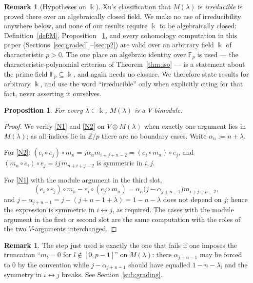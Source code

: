 \documentclass[11pt,reqno]{amsart}
\theoremstyle{plain}
\newtheorem{proposition}[theorem]{Proposition}
\theoremstyle{definition}
\newtheorem{remark}[theorem]{Remark}
\newcommand{\kk}{\Bbbk}
\newcommand{\Fp}{\mathbb{F}_p}
\newcommand{\Zp}{\mathbb{Z}/p}
\begin{document}
\begin{remark}[Hypotheses on $\kk$]\label{rem:hypotheses}
Xu's classification \cite{Xu1996} that $M(\lambda)$ is \emph{irreducible} is proved there over
an algebraically closed field. We make no use of irreducibility anywhere below, and none of
our results require $\kk$ to be algebraically closed: Definition~\ref{def:M}, Proposition~
\ref{prop:module}, and every cohomology computation in this paper (Sections~\ref{sec:graded}
--\ref{sec:p2}) are valid over an arbitrary field $\kk$ of characteristic $p>0$. The one place
an algebraic identity over $\Fp$ is used --- the characteristic-polynomial criterion of
Theorem~\ref{thm:iso} --- is a statement about the prime field $\Fp\subseteq\kk$, and again
needs no closure. We therefore state results for arbitrary $\kk$, and use the word
``irreducible'' only when explicitly citing \cite{Xu1996} for that fact, never asserting it
ourselves.
\end{remark}

\begin{proposition}\label{prop:module}
For every $\lambda\in\kk$, $M(\lambda)$ is a $V$-bimodule.
\end{proposition}

\begin{proof}
We verify \eqref{N1} and \eqref{N2} on $V\oplus M(\lambda)$ when exactly one argument lies in
$M(\lambda)$; as all indices lie in $\Zp$ there are no boundary cases. Write
$\alpha_n:=n+\lambda$.

For \eqref{N2}: $(e_i\circ e_j)\circ m_n=j\alpha_n m_{i+j+n-2}=(e_i\circ m_n)\circ e_j$, and
$(m_n\circ e_i)\circ e_j=ij\,m_{n+i+j-2}$ is symmetric in $i,j$.

For \eqref{N1} with the module argument in the third slot,
\[
(e_i\circ e_j)\circ m_n-e_i\circ(e_j\circ m_n)
=\alpha_n\bigl(j-\alpha_{j+n-1}\bigr)m_{i+j+n-2},
\]
and $j-\alpha_{j+n-1}=j-(j+n-1+\lambda)=1-n-\lambda$ does not depend on $j$; hence the
expression is symmetric in $i\leftrightarrow j$, as required. The cases with the module
argument in the first or second slot are the same computation with the roles of the two
$V$-arguments interchanged.
\end{proof}

\begin{remark}\label{rem:whytrunc}
The step just used is exactly the one that fails if one imposes the truncation
``$m_l=0$ for $l\notin[0,p-1]$'' on $M(\lambda)$: there $\alpha_{j+n-1}$ may be forced to
$0$ by the convention while $j-\alpha_{j+n-1}$ should have equalled $1-n-\lambda$, and the
symmetry in $i\leftrightarrow j$ breaks. See Section~\ref{sub:grading}.
\end{remark}
\end{document}
